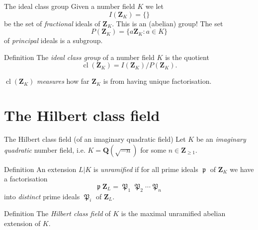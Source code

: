\documentclass{beamer}
\DeclareMathOperator{\cl}{cl}
\DeclareMathOperator{\p}{\mathfrak{p}}
\DeclareMathOperator{\pp}{\mathfrak{P}}
\begin{document}
\begin{frame}{The ideal class group}
Given a number field $K$ we let
\[
I(\mathbf{Z}_K) = \{\}
\]
be the set of \emph{fractional} ideals of $\mathbf{Z}_K$.
\pause
This is an (abelian) group!
\pause
The set
\[
P(\mathbf{Z}_K)= \{a\mathbf{Z}_K : a\in K\}
\]
of \emph{principal} ideals is a subgroup.
\pause
\begin{block}{Definition}
The \emph{ideal class group} of a number field $K$ is the quotient
\[
\cl(\mathbf{Z}_K) = I(\mathbf{Z}_K)/P(\mathbf{Z}_K).
\]
\end{block}
\pause
$\cl(\mathbf{Z}_K)$ \emph{measures} how far $\mathbf{Z}_K$ is from having unique factorisation.
\end{frame}

\section{The Hilbert class field}
\begin{frame}{The Hilbert class field (of an imaginary quadratic field)}
Let $K$ be an \emph{imaginary quadratic} number field, i.e. $K = \mathbf{Q}(\sqrt{-n})$ for some $n \in \mathbf{Z}_{\ge 1}$.
\pause
\begin{block}{Definition}
An extension $L|K$ is \emph{unramified} if for all prime ideals $\p$ of $\mathbf{Z}_K$ we have a factorisation
\[
\p\mathbf{Z}_L = \pp_1\pp_2\cdots \pp_n
\]
into \emph{distinct} prime ideals $\pp_i$ of $\mathbf{Z}_L$.
\end{block}
\pause
\begin{block}{Definition}
The \emph{Hilbert class field} of $K$ is the maximal unramified abelian extension of $K$.
\end{block}
\end{frame}
\end{document}
